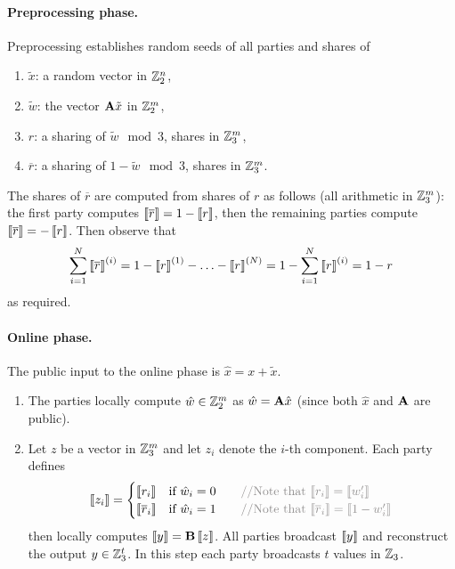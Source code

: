 \paragraph{Preprocessing phase.} Preprocessing establishes random seeds of all parties and shares of 
\begin{enumerate}
\item $\tilde{x}$: a random vector in $\mathbb{Z}_2^{n}$,
\item $\tilde{w}$: the vector $\mathbf{A} \tilde{x}$ in $\mathbb{Z}_2^{m}$, 
\item $r$: a sharing of $\tilde{w} \mod 3$, shares in $\mathbb{Z}_3^m$,  
\item $\overline{r}$: a sharing of $1-\tilde{w} \mod 3$, shares in $\mathbb{Z}_3^m$. 
\end{enumerate}
The shares of $\overline{r}$ are computed from shares of $r$ as follows (all arithmetic in $\mathbb{Z}_3^m$): the first
party computes $\left\llbracket \overline{r} \right\rrbracket = 1 - \left\llbracket r \right\rrbracket$, then the remaining parties compute
$\left\llbracket \overline{r} \right\rrbracket = - \left\llbracket r \right\rrbracket$.  Then observe that 
\[\sum_{i=1}^N \left\llbracket \overline{r} \right\rrbracket^{(i)} = 1 - \left\llbracket r \right\rrbracket^{(1)} - \ldots - \left\llbracket r \right\rrbracket^{(N)} = 1 - \sum_{i=1}^{N} \left\llbracket r \right\rrbracket^{(i)} = 1-r \]
 as required. 

\paragraph{Online phase.}
The public input to the online phase is $\hat{x} = x + \tilde{x}$. 
\begin{enumerate}

\item The parties locally compute $\hat{w} \in \mathbb{Z}_2^{m}$ as $\hat{w} = \mathbf{A}\hat{x}$ (since both $\hat{x}$ and $\mathbf{A}$ are public). 

\item Let $z$ be a vector in $\mathbb{Z}_3^m$ and let $z_i$ denote the $i$-th component. Each party defines 
\[
    \share{z_i}  = \begin{cases}
                \share{r_i}  & \text{if $\hat{w}_i = 0$} \algcomment{\text{Note that $\share{r_i} = \share{w_i'}$}}\\
                \share{\overline{r}_i}  & \text{if $\hat{w}_i = 1$} \algcomment{\text{Note that $\share{\overline{r}_i} = \share{1- w_i'}$}}\\
            \end{cases}
\]
then locally computes $\left\llbracket y \right\rrbracket = \mathbf{B}\left\llbracket z \right\rrbracket$. All parties broadcast $\left\llbracket y \right\rrbracket$ and reconstruct the output $y\in\mathbb{Z}_{3}^t$. 
In this step each party broadcasts $t$ values in $\mathbb{Z}_3$.
\end{enumerate}

